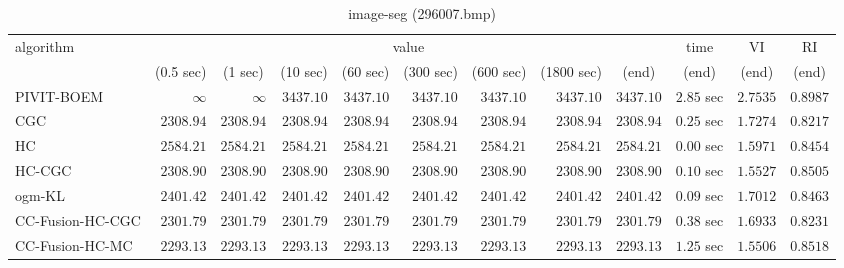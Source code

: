 \begin{table}[H]
\scriptsize
\centering
\caption{image-seg (296007.bmp)}
\label{tab:anytimetable-image-seg-296007.bmp}
\begin{tabular}{lrrrrrrrrrrr}
\toprule
           algorithm &                                   \multicolumn{8}{c}{value} & \multicolumn{1}{c}{time}    & \multicolumn{1}{c}{VI}  & \multicolumn{1}{c}{RI} \\  
\cmidrule(lr){2-9}\cmidrule(lr){10-10} \cmidrule(lr){11-11} \cmidrule(lr){12-12}   
                     & \multicolumn{1}{c}{(0.5 sec)} & \multicolumn{1}{c}{(1 sec)} & \multicolumn{1}{c}{(10 sec)} & \multicolumn{1}{c}{(60 sec)} & \multicolumn{1}{c}{(300 sec)} & \multicolumn{1}{c}{(600 sec)} & \multicolumn{1}{c}{(1800 sec)} & \multicolumn{1}{c}{(end)} & \multicolumn{1}{c}{(end)}    & \multicolumn{1}{c}{(end)}   & \multicolumn{1}{c}{(end)}  \\ \midrule 
          PIVIT-BOEM & $\infty$ & $\infty$ & $      3437.10$ & $      3437.10$ & $      3437.10$ & $      3437.10$ & $      3437.10$ & $      3437.10$ & $         2.85$ sec    & $       2.7535$  & $       0.8987$ \\ 
                 CGC & $      2308.94$ & $      2308.94$ & $      2308.94$ & $      2308.94$ & $      2308.94$ & $      2308.94$ & $      2308.94$ & $      2308.94$ & $         0.25$ sec    & $       1.7274$  & $       0.8217$ \\ 
                  HC & $      2584.21$ & $      2584.21$ & $      2584.21$ & $      2584.21$ & $      2584.21$ & $      2584.21$ & $      2584.21$ & $      2584.21$ & $         0.00$ sec    & $       1.5971$  & $       0.8454$ \\ 
              HC-CGC & $      2308.90$ & $      2308.90$ & $      2308.90$ & $      2308.90$ & $      2308.90$ & $      2308.90$ & $      2308.90$ & $      2308.90$ & $         0.10$ sec    & $       1.5527$  & $       0.8505$ \\ 
              ogm-KL & $      2401.42$ & $      2401.42$ & $      2401.42$ & $      2401.42$ & $      2401.42$ & $      2401.42$ & $      2401.42$ & $      2401.42$ & $         0.09$ sec    & $       1.7012$  & $       0.8463$ \\ 
    CC-Fusion-HC-CGC & $      2301.79$ & $      2301.79$ & $      2301.79$ & $      2301.79$ & $      2301.79$ & $      2301.79$ & $      2301.79$ & $      2301.79$ & $         0.38$ sec    & $       1.6933$  & $       0.8231$ \\ 
     CC-Fusion-HC-MC & $      2293.13$ & $      2293.13$ & $      2293.13$ & $      2293.13$ & $      2293.13$ & $      2293.13$ & $      2293.13$ & $      2293.13$ & $         1.25$ sec    & $       1.5506$  & $       0.8518$ \\ 

\end{tabular}
\end{table}

